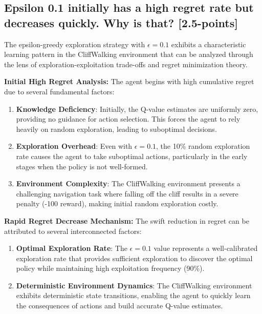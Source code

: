 \documentclass[12pt]{article}
\begin{document}
{{{\subsection{Epsilon 0.1 initially has a high regret rate but decreases quickly. Why is that? [2.5-points]}

The epsilon-greedy exploration strategy with $\epsilon = 0.1$ exhibits a characteristic learning pattern in the CliffWalking environment that can be analyzed through the lens of exploration-exploitation trade-offs and regret minimization theory.

\textbf{Initial High Regret Analysis:}
The agent begins with high cumulative regret due to several fundamental factors:

\begin{enumerate}
    \item \textbf{Knowledge Deficiency}: Initially, the Q-value estimates are uniformly zero, providing no guidance for action selection. This forces the agent to rely heavily on random exploration, leading to suboptimal decisions.
    
    \item \textbf{Exploration Overhead}: Even with $\epsilon = 0.1$, the 10\% random exploration rate causes the agent to take suboptimal actions, particularly in the early stages when the policy is not well-formed.
    
    \item \textbf{Environment Complexity}: The CliffWalking environment presents a challenging navigation task where falling off the cliff results in a severe penalty (-100 reward), making initial random exploration costly.
\end{enumerate}

\textbf{Rapid Regret Decrease Mechanism:}
The swift reduction in regret can be attributed to several interconnected factors:

\begin{enumerate}
    \item \textbf{Optimal Exploration Rate}: The $\epsilon = 0.1$ value represents a well-calibrated exploration rate that provides sufficient exploration to discover the optimal policy while maintaining high exploitation frequency (90\%).
    
    \item \textbf{Deterministic Environment Dynamics}: The CliffWalking environment exhibits deterministic state transitions, enabling the agent to quickly learn the consequences of actions and build accurate Q-value estimates.
    

\end{enumerate}}}}
\end{document}
